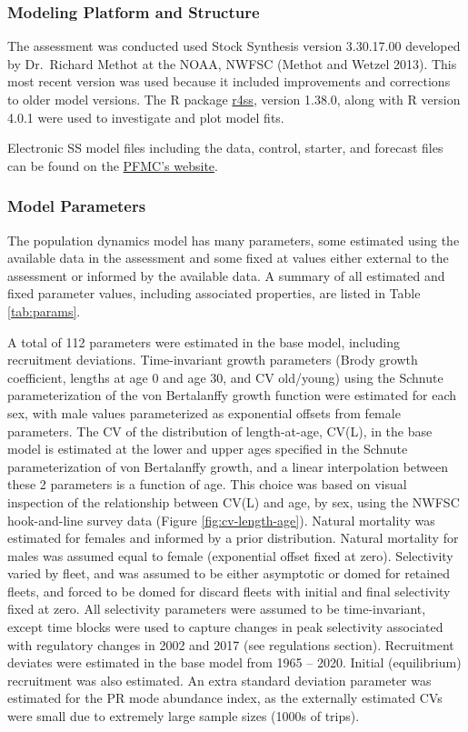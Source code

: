 \documentclass[
  english,
  a4paper,
]{article}
\begin{document}
\hypertarget{modeling-platform-and-structure}{%
\subsubsection{Modeling Platform and Structure}\label{modeling-platform-and-structure}}

The assessment was conducted used Stock Synthesis version 3.30.17.00 developed by
Dr.~Richard Methot at the NOAA, NWFSC (Methot and Wetzel 2013). This most recent
version was used because it included improvements and corrections to older
model versions. The R package \href{https://github.com/r4ss/r4ss}{r4ss}, version
1.38.0, along with R version 4.0.1 were used to investigate and plot model fits.

Electronic SS model files including the data, control, starter, and forecast files can be
found on the
\href{https://www.pcouncil.org/groundfish/stock-assessments/}{PFMC's website}.

\hypertarget{model-parameters}{%
\subsubsection{Model Parameters}\label{model-parameters}}

The population dynamics model has many parameters, some estimated using the available data in the assessment and some fixed at values either external to the assessment or informed by the available data. A summary of all estimated and fixed parameter values, including associated properties, are listed in Table \ref{tab:params}.

A total of 112 parameters were estimated in the base model, including recruitment deviations. Time-invariant growth parameters (Brody growth coefficient, lengths at age 0 and age 30, and CV old/young) using the Schnute parameterization of the von Bertalanffy growth function were estimated for each sex, with male values parameterized as exponential offsets from female parameters. The CV of the distribution of length-at-age, CV(L), in the base model is estimated at the lower and upper ages specified in the Schnute parameterization of von Bertalanffy growth, and a linear interpolation between these 2 parameters is a function of age. This choice was based on visual inspection of the relationship between CV(L) and age, by sex, using the NWFSC hook-and-line survey data (Figure \ref{fig:cv-length-age}). Natural mortality was estimated for females and informed by a prior distribution. Natural mortality for males was assumed equal to female (exponential offset fixed at zero). Selectivity varied by fleet, and was assumed to be either asymptotic or domed for retained fleets, and forced to be domed for discard fleets with initial and final selectivity fixed at zero. All selectivity parameters were assumed to be time-invariant, except time blocks were used to capture changes in peak selectivity associated with regulatory changes in 2002 and 2017 (see regulations section). Recruitment deviates were estimated in the base model from 1965 -- 2020. Initial (equilibrium) recruitment was also estimated. An extra standard deviation parameter was estimated for the PR mode abundance index, as the externally estimated CVs were small due to extremely large sample sizes (1000s of trips).
\end{document}
